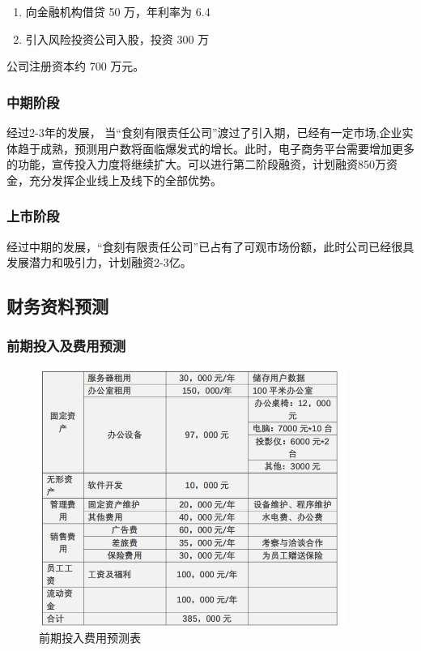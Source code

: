 \documentclass[UTF8,12pt]{ctexart}
\numberwithin{figure}{section}%
\begin{document}
\begin{spacing}{2}
\begin{enumerate}
	\item[(2)]向金融机构借贷 50 万，年利率为 6.4%
	
	\item[(3)]引入风险投资公司入股，投资 300 万
	
\end{enumerate}
公司注册资本约 700 万元。


\subsubsection{中期阶段}

经过2-3年的发展， 当“食刻有限责任公司”渡过了引入期，已经有一定市场,企业实体趋于成熟，预测用户数将面临爆发式的增长。此时，电子商务平台需要增加更多的功能，宣传投入力度将继续扩大。可以进行第二阶段融资，计划融资850万资金，充分发挥企业线上及线下的全部优势。

\subsubsection{上市阶段}

经过中期的发展，“食刻有限责任公司”已占有了可观市场份额，此时公司已经很具发展潜力和吸引力，计划融资2-3亿。 


\subsection{财务资料预测}

\subsubsection{前期投入及费用预测}

\begin{figure}[!htb]
	\centering
	\includegraphics[width=10cm]{fig/26}
	\caption{前期投入费用预测表}
\end{figure}



\end{spacing}
\end{document}
